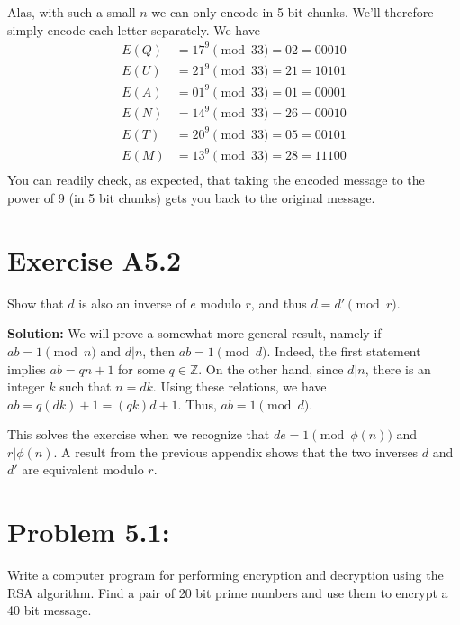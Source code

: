 \documentclass{book}
\begin{document}
    Alas, with such a small $n$ we can only encode in 5 bit chunks. We'll therefore simply encode each letter separately. We have
    \begin{align}
        E(Q) &= 17^9 \pmod{33} = 02 = 00010 \\
        E(U) &= 21^9 \pmod{33} = 21 = 10101 \\
        E(A) &= 01^9 \pmod{33} = 01 = 00001 \\
        E(N) &= 14^9 \pmod{33} = 26 = 00010 \\
        E(T) &= 20^9 \pmod{33} = 05 = 00101 \\
        E(M) &= 13^9 \pmod{33} = 28 = 11100 \\
    \end{align}
    You can readily check, as expected, that taking the encoded message to the power of 9 (in 5 bit chunks) gets you back to the original message.

\section*{Exercise A5.2} 
    Show that $d$ is also an inverse of $e$ modulo $r$, and thus $d=d'\pmod{r}$.
    
    \textbf{Solution:} We will prove a somewhat more general result, namely if $ab = 1\pmod{n}$ and $d|n$, then $ab=1\pmod{d}$. Indeed, the first statement implies $ab = qn + 1$ for some $q\in \mathbb{Z}$. On the other hand, since $d|n$, there is an integer $k$ such that $n = dk$. Using these relations, we have $ab = q(dk)+1 = (qk)d + 1$. Thus, $ab=1\pmod{d}$.
    
    This solves the exercise when we recognize that $de=1\pmod{\phi(n)}$ and $r|\phi(n)$. A result from the previous appendix shows that the two inverses $d$ and $d'$ are equivalent modulo $r$.

\section*{Problem 5.1:} 
    Write a computer program for performing encryption and decryption using the RSA algorithm. Find a pair of 20 bit prime numbers and use them to encrypt a 40 bit message.
    
\end{document}
